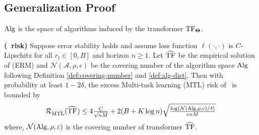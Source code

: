 \subsection{Generalization Proof}
\label{app:generalization}

$\mathrm{Alg}$ is the space of algorithms induced by the transformer $\mathrm{TF}_{\mathbf{\Theta}}$. 


\begin{theorem}
\label{thm:multi-task-risk-app}\textbf{(\pred\ risk)}
    Suppose error stability  holds and assume loss function $\ell(\cdot,\cdot)$ is $C$-Lipschitz for all $r_t \in [0,B]$ and horizon $n\geq 1$. Let $\widehat{\mathrm{TF}}$ be the empirical solution of (ERM) and $\mathcal{N}(\mathcal{A}, \rho, \epsilon)$ be the covering number of the algorithm space $\mathrm{Alg}$ following Definition \ref{def:covering-number} and \ref{def:alg-dist}. Then with probability at least $1-2 \delta$, the excess Multi-task learning (MTL) risk of \predt\ is bounded by %
    \begin{align*}
        \mathcal{R}^{}_{\mathrm{MTL}}(\widehat{\mathrm{TF}}_{}) \leq 4 \tfrac{C}{\sqrt{nM}} +2(B+K \log n) \sqrt{\tfrac{\log (\mathcal{N}(\mathrm{Alg}, \rho, \varepsilon) / \delta)}{c n M}}
    \end{align*}
    where, $\mathcal{N}(\mathrm{Alg}, \rho, \varepsilon)$ is the covering number of transformer $\widehat{\mathrm{TF}}_{}$. 
\end{theorem}


